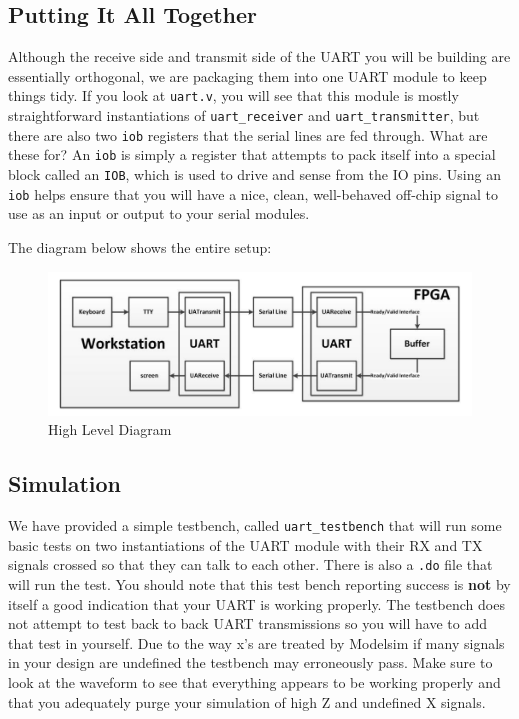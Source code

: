 \documentclass[11pt]{article}
\begin{document}
\subsection{Putting It All Together}
Although the receive side and transmit side of the UART you will be building are essentially orthogonal, we are packaging them into one UART module to keep things tidy. If you look at \verb|uart.v|, you will see that this module is mostly straightforward instantiations of \verb|uart_receiver| and \verb|uart_transmitter|, but there are also two \verb|iob| registers that the serial lines are fed through. What are these for? An \verb|iob| is simply a register that attempts to pack itself into a special block called an \verb|IOB|, which is used to drive and sense from the IO pins. Using an \verb|iob| helps ensure that you will have a nice, clean, well-behaved off-chip signal to use as an input or output to your serial modules.

The diagram below shows the entire setup:
\begin{figure}[H]
	\centerline{\includegraphics[width=6in]{images/high_level_diagram.png}}
	\caption{High Level Diagram}
\end{figure}

\subsection{Simulation}
We have provided a simple testbench, called \verb|uart_testbench| that will run some basic tests on two instantiations of the UART module with their RX and TX signals crossed so that they can talk to each other. There is also a \verb|.do| file that will run the test. You should note that this test bench reporting success is \textbf{not} by itself a good indication that your UART is working properly. The testbench does not attempt to test back to back UART transmissions so you will have to add that test in yourself. Due to the way x's are treated by Modelsim if many signals in your design are undefined the testbench may erroneously pass. Make sure to look at the waveform to see that everything appears to be working properly and that you adequately purge your simulation of high Z and undefined X signals. 
\end{document}
